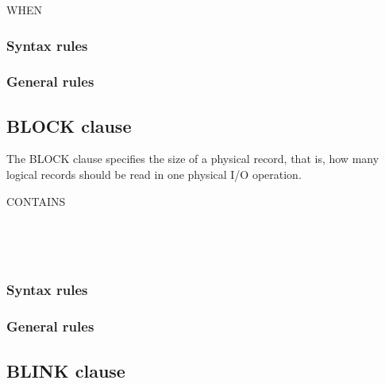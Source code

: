 \begin{syntax}
   WHEN 
\end{syntax}

\subsubsection{Syntax rules}

\subsubsection{General rules}

\subsection{BLOCK clause}

The BLOCK clause specifies the size of a physical record, that is, how many logical records should be read in one physical I/O operation.

\begin{syntax}
   CONTAINS \integer
  \begin{0-1}
     \integer
  \end{0-1}
  \begin{0-1}
     \\
  \end{0-1}\\
\end{syntax}

\subsubsection{Syntax rules}

\subsubsection{General rules}

\subsection{BLINK clause}

\begin{syntax}
  \begin{1=}
     \\
  \end{1=}
\end{syntax}

